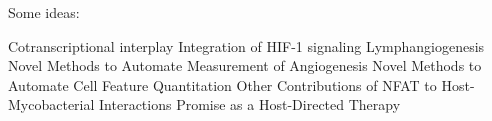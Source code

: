 


Some ideas:

Cotranscriptional interplay
Integration of HIF-1\textalpha{} signaling
Lymphangiogenesis
Novel Methods to Automate Measurement of Angiogenesis
Novel Methods to Automate Cell Feature Quantitation
Other Contributions of NFAT to Host-Mycobacterial Interactions
Promise as a Host-Directed Therapy
